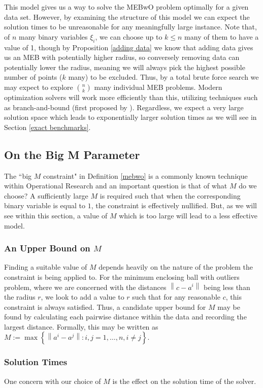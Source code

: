 \documentclass[11pt,twoside]{report}
\newcommand{\norm}[1]{\left\lVert#1\right\rVert}
\theoremstyle{definition}
\numberwithin{theorem}{section}
\numberwithin{definition}{section}
\numberwithin{lemma}{section}
\numberwithin{proposition}{section}
\numberwithin{equation}{section}
\begin{document}
This model gives us a way to solve the MEBwO problem optimally for a given data set. However, by examining the structure of this model we can expect the solution times to be unreasonable for any meaningfully large instance. Note that, of $n$ many binary variables $\xi_i$, we can choose up to $k\leq n$ many of them to have a value of 1, though by Proposition \ref{adding data} we know that adding data gives us an MEB with potentially higher radius, so conversely removing data can potentially lower the radius, meaning we will always pick the highest possible number of points ($k$ many) to be excluded. Thus, by a total brute force search we may expect to explore $\binom{n}{k}$ many individual MEB problems. Modern optimization solvers will work more efficiently than this, utilizing techniques such as branch-and-bound (first proposed by \cite{bnb}). Regardless, we expect a very large solution space which leads to exponentially larger solution times as we will see in Section \ref{exact benchmarks}.


\subsection{On the Big M Parameter}
The ``big $M$ constraint" in Definition \ref{mebwo} is a commonly known technique within Operational Research and an important question is that of what $M$ do we choose? A sufficiently large $M$ is required such that when the corresponding binary variable is equal to $1$, the constraint is effectively nullified. But, as we will see within this section, a value of $M$ which is too large will lead to a less effective model.

\subsubsection{An Upper Bound on $M$}
Finding a suitable value of $M$ depends heavily on the nature of the problem the constraint is being applied to. For the minimum enclosing ball with outliers problem, where we are concerned with the distances $\norm{c-a^i}$ being less than the radius $r$, we look to add a value to $r$ such that for any reasonable $c$, this constraint is always satisfied. Thus, a candidate upper bound for $M$ may be found by calculating each pairwise distance within the data and recording the largest distance. Formally, this may be written as $M:= \max\left\{\norm{a^i-a^j}: i,j = 1,\ldots,n, i\neq j\right\}$.
\subsubsection{Solution Times}
One concern with our choice of $M$ is the effect on the solution time of the solver.
\end{document}
